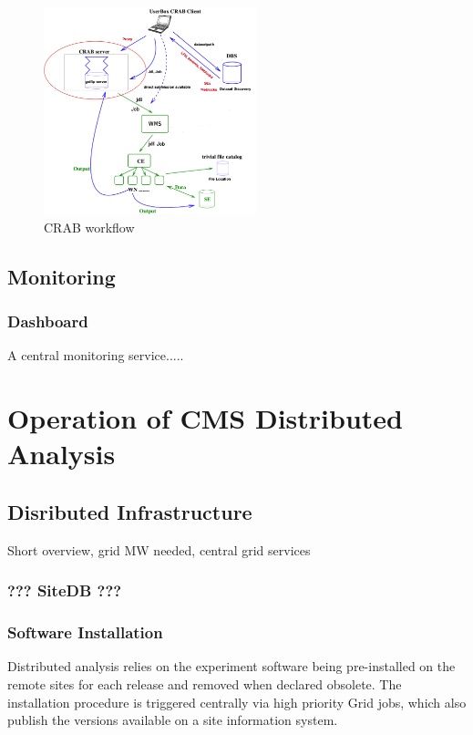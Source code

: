 \begin{figure}
 \includegraphics[width=0.55\textwidth]{figures/CRABWorkflow.png}
\caption{CRAB workflow}
\label{fig:CRABWorkflow}
\end{figure}

\subsection{Monitoring}
\label{sec:3_3}
\subsubsection{Dashboard}
A central monitoring service.....

\section{Operation of CMS Distributed Analysis}
\label{sec:4}
\subsection{Disributed Infrastructure}
\label{sec:4_1}
Short overview, grid MW needed, central grid services
\subsubsection{ ??? SiteDB ???}
\subsubsection{ Software Installation }
\label{sec:4_1_1}
Distributed analysis relies on the experiment software being pre-installed on the remote
sites for each release and removed when declared obsolete. 
The installation procedure is triggered centrally via high priority Grid jobs, which also 
publish the versions available on a site information system.

